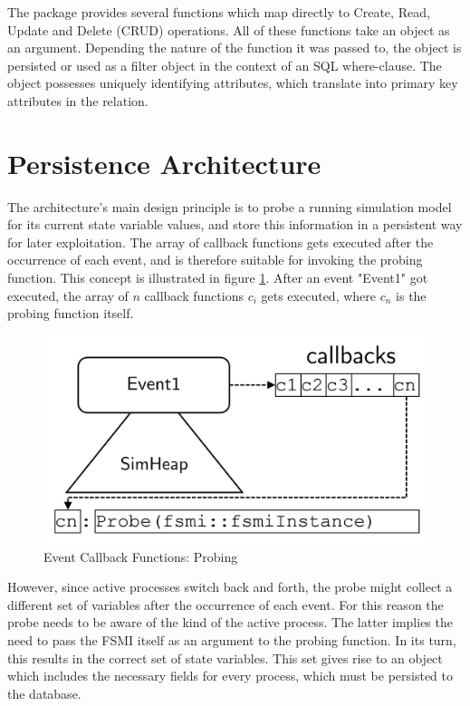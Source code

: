\documentclass{juliacon}
\begin{document}
The package provides several functions which map directly to Create, Read, Update and Delete (CRUD) operations. All of these functions take an object as an argument. Depending the nature of the function it was passed to, the object is persisted or used as a filter object in the context of an SQL where-clause. The object possesses uniquely identifying attributes, which translate into primary key attributes in the relation. \vskip 6pt

\section{Persistence Architecture}\label{PArch}
The architecture's main design principle is to probe a running simulation model for its current state variable values, and store this information in a persistent way for later exploitation. The array of callback functions gets executed after the occurrence of each event, and is therefore suitable for invoking the probing function.
This concept is illustrated in figure \ref{fig:cbprobing}. After an event "Event1" got executed, the array of $n$ callback functions $c_i$ gets executed, where $c_n$ is the probing function itself.

\begin{figure}[th]
	\centering
	\includegraphics[width=0.9\linewidth]{images/simHeapCallbacksProbe}
	\caption{Event Callback Functions: Probing}
	\label{fig:cbprobing}
\end{figure}
 However, since active processes switch back and forth, the probe might collect a different set of variables after the occurrence of each event. For this reason the probe needs to be aware of the kind of the active process. The latter implies the need to pass the FSMI itself as an argument to the probing function. In its turn, this results in the correct set of state variables. This set gives rise to an object which includes the necessary fields for every process, which must be persisted to the database. \vskip 6pt
\end{document}
